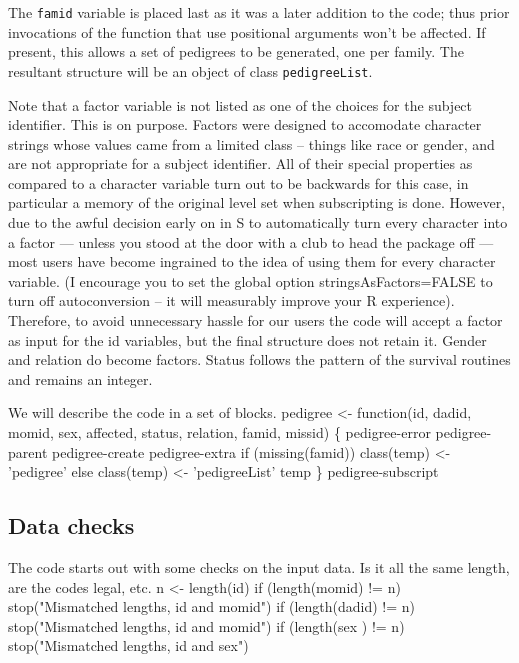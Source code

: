 \documentclass{article}
\begin{document}
The {\tt{}famid} variable is placed last as it was a later addition to the
code; thus prior invocations of the function that use positional 
arguments won't be affected.                                       %
If present, this allows a set of pedigrees to be generated, one per
family.  The resultant structure will be an object of class
{\tt{}pedigreeList}.

Note that a factor variable is not listed as one of the choices for the
subject identifier. This is on purpose.  Factors
were designed to accomodate character strings whose values came from a limited
class -- things like race or gender, and are not appropriate for a subject
identifier.  All of their special properties as compared to a character
variable turn out to be backwards for this case, in particular a memory
of the original level set when subscripting is done.
However, due to the awful decision early on in S to automatically turn every
character into a factor --- unless you stood at the door with a club to
head the package off --- most users have become ingrained to the idea of
using them for every character variable. 
(I encourage you to set the global option stringsAsFactors=FALSE to turn
off autoconversion -- it will measurably improve your R experience).
Therefore, to avoid unnecessary hassle for our users 
the code will accept a factor as input for the id variables, but
the final structure does not retain it.  
Gender and relation do become factors.  Status follows the pattern of the 
survival routines and remains an integer.

We will describe the code in a set of blocks.
\endmoddef
pedigree <- function(id, dadid, momid, sex, affected, status, relation,
                     famid, missid) \{
    \LA{}pedigree-error\RA{}
    \LA{}pedigree-parent\RA{}
    \LA{}pedigree-create\RA{}
    \LA{}pedigree-extra\RA{}
    if (missing(famid)) class(temp) <- 'pedigree'
    else class(temp) <- 'pedigreeList'
    temp
    \}
\LA{}pedigree-subscript\RA{}
\nwendcode{}\nwdocspar

\subsection{Data checks}
The code starts out with some checks on the input data.  
Is it all the same length, are the codes legal, etc.
\nwenddocs{}\endmoddef
n <- length(id)
if (length(momid) != n) stop("Mismatched lengths, id and momid")
if (length(dadid) != n) stop("Mismatched lengths, id and momid")
if (length(sex  ) != n) stop("Mismatched lengths, id and sex")
\end{document}
